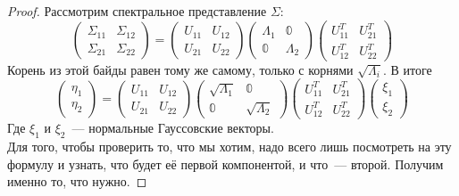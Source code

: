 \documentclass{article}
\begin{document}
    \begin{proof}
        Рассмотрим спектральное представление $\Sigma$:
        $$
        \left(\begin{matrix}
            \Sigma_{11} & \Sigma_{12}\\\Sigma_{21} & \Sigma_{22}
        \end{matrix}\right)=
        \left(\begin{matrix}
            U_{11} & U_{12}\\U_{21} & U_{22}
        \end{matrix}\right)
        \left(\begin{matrix}
            \Lambda_{1} & \mathbb0\\\mathbb0 & \Lambda_{2}
        \end{matrix}\right)
        \left(\begin{matrix}
            U_{11}^T & U_{21}^T\\U_{12}^T & U_{22}^T
        \end{matrix}\right)
        $$
        Корень из этой байды равен тому же самому, только с корнями $\sqrt{\Lambda_i}$. В итоге
        $$
        \left(\begin{matrix}
            \eta_{1}\\\eta_{2}
        \end{matrix}\right)=
        \left(\begin{matrix}
            U_{11} & U_{12}\\U_{21} & U_{22}
        \end{matrix}\right)
        \left(\begin{matrix}
            \sqrt{\Lambda_{1}} & \mathbb0\\\mathbb0 & \sqrt{\Lambda_{2}}
        \end{matrix}\right)
        \left(\begin{matrix}
            U_{11}^T & U_{21}^T\\U_{12}^T & U_{22}^T
        \end{matrix}\right)
        \left(\begin{matrix}
            \xi_{1}\\\xi_{2}
        \end{matrix}\right)
        $$
        Где $\xi_1$ и $\xi_2$~--- нормальные Гауссовские векторы.\\
        Для того, чтобы проверить то, что мы хотим, надо всего лишь посмотреть на эту формулу и узнать, что будет её первой компонентой, и что~--- второй. Получим именно то, что нужно.
    \end{proof}
\end{document}
